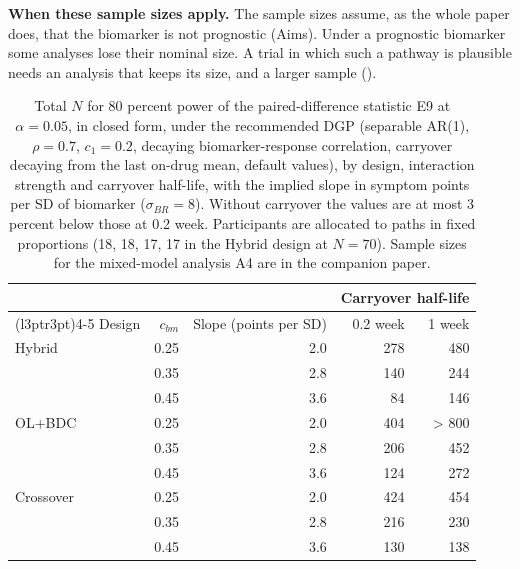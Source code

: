\documentclass[
  11pt,
]{article}
\begin{document}
\textbf{When these sample sizes apply.} The sample sizes assume, as the
whole paper does, that the biomarker is not prognostic (Aims). Under
a prognostic biomarker some analyses lose their nominal size. A trial
in which such a pathway is plausible needs an analysis that keeps its
size, and a larger sample ().

\begin{table}

\caption{\label{tab:planning}Total $N$ for 80 percent power of the paired-difference statistic E9 at $\alpha = 0.05$, in closed form, under the recommended DGP (separable AR(1), $\rho = 0.7$, $c_1 = 0.2$, decaying biomarker-response correlation, carryover decaying from the last on-drug mean, default values), by design, interaction strength and carryover half-life, with the implied slope in symptom points per SD of biomarker ($\sigma_{BR} = 8$). Without carryover the values are at most 3 percent below those at 0.2 week. Participants are allocated to paths in fixed proportions (18, 18, 17, 17 in the Hybrid design at $N = 70$). Sample sizes for the mixed-model analysis A4 are in the companion paper.}
\centering
\begin{tabular}[t]{lrrrr}
\toprule
\multicolumn{3}{c}{ } & \multicolumn{2}{c}{Carryover half-life} \\
\cmidrule(l{3pt}r{3pt}){4-5}
Design & $c_{bm}$ & Slope (points per SD) & 0.2 week & 1 week\\
\midrule
Hybrid & 0.25 & 2.0 & 278 & 480\\
 & 0.35 & 2.8 & 140 & 244\\
 & 0.45 & 3.6 & 84 & 146\\
OL+BDC & 0.25 & 2.0 & 404 & > 800\\
 & 0.35 & 2.8 & 206 & 452\\
 & 0.45 & 3.6 & 124 & 272\\
Crossover & 0.25 & 2.0 & 424 & 454\\
 & 0.35 & 2.8 & 216 & 230\\
 & 0.45 & 3.6 & 130 & 138\\
\bottomrule
\end{tabular}
\end{table}
\end{document}
